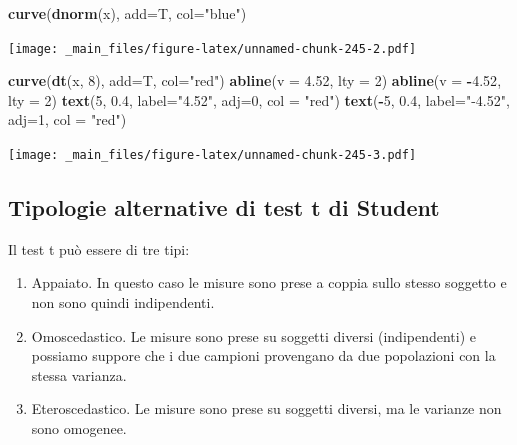 \documentclass[a4paper,12pt,oneside]{book}
\providecommand{\tightlist}{%
  \setlength{\itemsep}{0pt}\setlength{\parskip}{0pt}}
\newenvironment{Shaded}{\begin{snugshade}}{\end{snugshade}}
\newcommand{\KeywordTok}[1]{\textcolor[rgb]{0.13,0.29,0.53}{\textbf{#1}}}
\newcommand{\DataTypeTok}[1]{\textcolor[rgb]{0.13,0.29,0.53}{#1}}
\newcommand{\DecValTok}[1]{\textcolor[rgb]{0.00,0.00,0.81}{#1}}
\newcommand{\FloatTok}[1]{\textcolor[rgb]{0.00,0.00,0.81}{#1}}
\newcommand{\StringTok}[1]{\textcolor[rgb]{0.31,0.60,0.02}{#1}}
\newcommand{\OperatorTok}[1]{\textcolor[rgb]{0.81,0.36,0.00}{\textbf{#1}}}
\newcommand{\NormalTok}[1]{#1}
\theoremstyle{definition}
\theoremstyle{definition}
\theoremstyle{definition}
\theoremstyle{remark}
\begin{document}
\begin{Shaded}
\begin{Highlighting}[]
\KeywordTok{curve}\NormalTok{(}\KeywordTok{dnorm}\NormalTok{(x), }\DataTypeTok{add=}\NormalTok{T, }\DataTypeTok{col=}\StringTok{"blue"}\NormalTok{)}
\end{Highlighting}
\end{Shaded}

\texttt{[image: \_main\_files/figure-latex/unnamed-chunk-245-2.pdf]}

\begin{Shaded}
\begin{Highlighting}[]
\KeywordTok{curve}\NormalTok{(}\KeywordTok{dt}\NormalTok{(x, }\DecValTok{8}\NormalTok{), }\DataTypeTok{add=}\NormalTok{T, }\DataTypeTok{col=}\StringTok{"red"}\NormalTok{)}
\KeywordTok{abline}\NormalTok{(}\DataTypeTok{v =} \FloatTok{4.52}\NormalTok{, }\DataTypeTok{lty =} \DecValTok{2}\NormalTok{)}
\KeywordTok{abline}\NormalTok{(}\DataTypeTok{v =} \OperatorTok{-}\FloatTok{4.52}\NormalTok{, }\DataTypeTok{lty =} \DecValTok{2}\NormalTok{)}
\KeywordTok{text}\NormalTok{(}\DecValTok{5}\NormalTok{, }\FloatTok{0.4}\NormalTok{, }\DataTypeTok{label=}\StringTok{"4.52"}\NormalTok{, }\DataTypeTok{adj=}\DecValTok{0}\NormalTok{, }\DataTypeTok{col =} \StringTok{"red"}\NormalTok{)}
\KeywordTok{text}\NormalTok{(}\OperatorTok{-}\DecValTok{5}\NormalTok{, }\FloatTok{0.4}\NormalTok{, }\DataTypeTok{label=}\StringTok{"-4.52"}\NormalTok{, }\DataTypeTok{adj=}\DecValTok{1}\NormalTok{, }\DataTypeTok{col =} \StringTok{"red"}\NormalTok{)}
\end{Highlighting}
\end{Shaded}

\texttt{[image: \_main\_files/figure-latex/unnamed-chunk-245-3.pdf]}

\subsection{Tipologie alternative di test t di
Student}\label{tipologie-alternative-di-test-t-di-student}

Il test t può essere di tre tipi:

\begin{enumerate}
\def\labelenumi{\arabic{enumi}.}
\tightlist
\item
  Appaiato. In questo caso le misure sono prese a coppia sullo stesso
  soggetto e non sono quindi indipendenti.
\item
  Omoscedastico. Le misure sono prese su soggetti diversi (indipendenti)
  e possiamo suppore che i due campioni provengano da due popolazioni
  con la stessa varianza.
\item
  Eteroscedastico. Le misure sono prese su soggetti diversi, ma le
  varianze non sono omogenee.
\end{enumerate}
\end{document}
